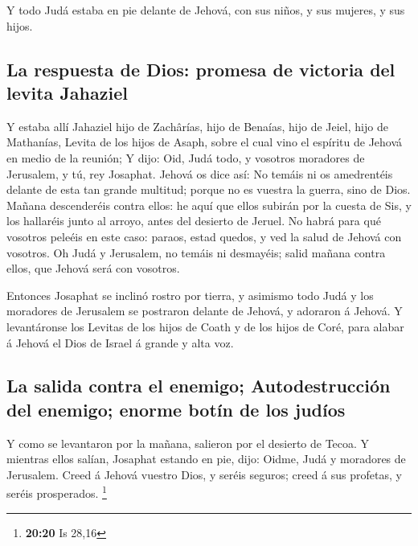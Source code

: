  Y todo Judá estaba en pie delante de Jehová, con sus
niños, y sus mujeres, y sus hijos.

\hypertarget{la-respuesta-de-dios-promesa-de-victoria-del-levita-jahaziel}{%
\subsection{La respuesta de Dios: promesa de victoria del levita
Jahaziel}\label{la-respuesta-de-dios-promesa-de-victoria-del-levita-jahaziel}}

 Y estaba allí Jahaziel hijo de Zachârías, hijo de
Benaías, hijo de Jeiel, hijo de Mathanías, Levita de los hijos de Asaph,
sobre el cual vino el espíritu de Jehová en medio de la reunión;
 Y dijo: Oid, Judá todo, y vosotros moradores de
Jerusalem, y tú, rey Josaphat. Jehová os dice así: No temáis ni os
amedrentéis delante de esta tan grande multitud; porque no es vuestra la
guerra, sino de Dios.  Mañana descenderéis contra ellos:
he aquí que ellos subirán por la cuesta de Sis, y los hallaréis junto al
arroyo, antes del desierto de Jeruel.  No habrá para qué
vosotros peleéis en este caso: paraos, estad quedos, y ved la salud de
Jehová con vosotros. Oh Judá y Jerusalem, no temáis ni desmayéis; salid
mañana contra ellos, que Jehová será con vosotros.

 Entonces Josaphat se inclinó rostro por tierra, y
asimismo todo Judá y los moradores de Jerusalem se postraron delante de
Jehová, y adoraron á Jehová.  Y levantáronse los Levitas
de los hijos de Coath y de los hijos de Coré, para alabar á Jehová el
Dios de Israel á grande y alta voz.

\hypertarget{la-salida-contra-el-enemigo-autodestrucciuxf3n-del-enemigo-enorme-botuxedn-de-los-juduxedos}{%
\subsection{La salida contra el enemigo; Autodestrucción del enemigo;
enorme botín de los
judíos}\label{la-salida-contra-el-enemigo-autodestrucciuxf3n-del-enemigo-enorme-botuxedn-de-los-juduxedos}}

 Y como se levantaron por la mañana, salieron por el
desierto de Tecoa. Y mientras ellos salían, Josaphat estando en pie,
dijo: Oidme, Judá y moradores de Jerusalem. Creed á Jehová vuestro Dios,
y seréis seguros; creed á sus profetas, y seréis prosperados.
\footnote{\textbf{20:20} Is 28,16}

